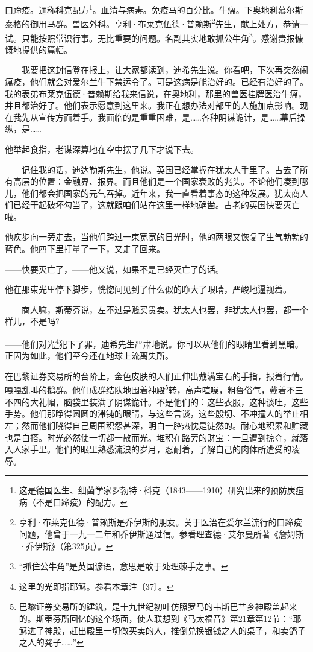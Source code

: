 \par 口蹄疫。通称科克配方\footnote{这是德国医生、细菌学家罗勃特·科克（1843——1910）研究出来的预防炭疽病（不是口蹄疫）的配方。}。血清与病毒。免疫马的百分比。牛瘟。下奥地利慕尔斯泰格的御用马群。兽医外科。亨利·布莱克伍德·普赖斯\footnote{亨利·布莱克伍德·普赖斯是乔伊斯的朋友。关于医治在爱尔兰流行的口蹄疫问题，他曾于一九一二年和乔伊斯通过信。参看理查德·艾尔曼所著《詹姆斯·乔伊斯》（第325页）。}先生，献上处方，恭请一试。只能按照常识行事。无比重要的问题。名副其实地敢抓公牛角\footnote{“抓住公牛角”是英国谚语，意思是敢于处理棘手之事。}。感谢贵报慷慨地提供的篇幅。
\par ——我要把这封信登在报上，让大家都读到，迪希先生说。你看吧，下次再突然闹瘟疫，他们就会对爱尔兰牛下禁运令了。可是这病是能治好的。已经有治好的了。我的表弟布莱克伍德·普赖斯给我来信说，在奥地利，那里的兽医挂牌医治牛瘟，并且都治好了。他们表示愿意到这里来。我正在想办法对部里的人施加点影响。现在我先从宣传方面着手。我面临的是重重困难，是……各种阴谋诡计，是……幕后操纵，是……
\par 他举起食指，老谋深算地在空中摆了几下才说下去。
\par ——记住我的话，迪达勒斯先生，他说。英国已经掌握在犹太人手里了。占去了所有高层的位置：金融界、报界。而且他们是一个国家衰败的兆头。不论他们凑到哪儿，他们都会把国家的元气吞掉。近年来，我一直看着事态的这种发展。犹太商人们已经干起破坏勾当了，这就跟咱们站在这里一样地确凿。古老的英国快要灭亡啦。
\par 他疾步向一旁走去，当他们跨过一束宽宽的日光时，他的两眼又恢复了生气勃勃的蓝色。他四下里打量了一下，又走了回来。
\par ——快要灭亡了，——他又说，如果不是已经灭亡了的话。
\par 他在那束光里停下脚步，恍惚间见到了什么似的睁大了眼睛，严峻地逼视着。
\par ——商人嘛，斯蒂芬说，左不过是贱买贵卖。犹太人也罢，非犹太人也罢，都一个样儿，不是吗?
\par ——他们对光\footnote{这里的光即指耶稣。参看本章注〔37〕。}犯下了罪，迪希先生严肃地说。你可以从他们的眼睛里看到黑暗。正因为如此，他们至今还在地球上流离失所。
\par 在巴黎证券交易所的台阶上，金色皮肤的人们正伸出戴满宝石的手指，报着行情。嘎嘎乱叫的鹅群。他们成群结队地围着神殿\footnote{巴黎证券交易所的建筑，是十九世纪初叶仿照罗马的韦斯巴艹乡神殿盖起来的。斯蒂芬所回忆的这个场面，使人联想到《马太福音》第21章第12节：“耶稣进了神殿，赶出殿里一切做买卖的人，推倒兑换银钱之人的桌子，和卖鸽子之人的凳子……”}转，高声喧噪，粗鲁俗气，戴着不三不四的大礼帽，脑袋里装满了阴谋诡计。不是他们的：这些衣服，这种谈吐，这些手势。他们那睁得圆圆的滞钝的眼睛，与这些言谈，这些殷切、不冲撞人的举止相左；然而他们晓得自己周围积怨甚深，明白一腔热忱是徒然的。耐心地积累和贮藏也是白搭。时光必然使一切都一散而光。堆积在路旁的财宝：一旦遭到掠夺，就落入人家手里。他们的眼里熟悉流浪的岁月，忍耐着，了解自己的肉体所遭受的凌辱。
